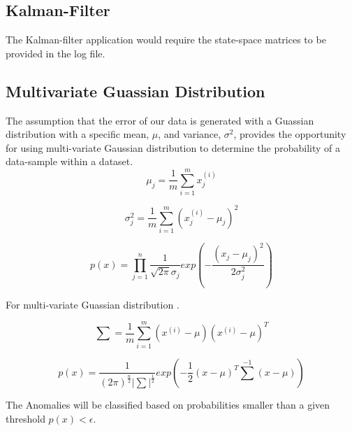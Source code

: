 \subsection{Kalman-Filter}
The Kalman-filter application would require the state-space matrices to be provided in the log file.

\subsection{Multivariate Guassian Distribution}
The assumption that the error of our data is generated with a Guassian distribution with a specific mean, $\mu$, and variance, $\sigma^2$, provides the opportunity for using multi-variate Gaussian distribution to determine the probability of a data-sample within a dataset. 
\begin{equation}
	\label{mean}
	\mu_j = \frac{1}{m} \sum_{i=1}^{m}x_j^{(i)}
\end{equation}

\begin{equation}
	\label{variance}
	\sigma_j^2 = \frac{1}{m} \sum_{i=1}^{m}(x_j^{(i)} - \mu_j)^2
\end{equation}

\begin{equation}
	\label{guassian distribution}
	p(x) = \prod_{j=1}^{n} \frac{1}{\sqrt{2\pi}\sigma_j}exp(-\frac{(x_j-\mu_j)^2}{2\sigma_j^2})
\end{equation}

For multi-variate Guassian distribution \cite{do2008multivariate}.

\begin{equation}
	\label{sum}
	\sum = \frac{1}{m}\sum_{i=1}^{m}(x^{(i)}-\mu)(x^{(i)}-\mu)^T
\end{equation}

\begin{equation}
	\label{multi-variate guassian distribution}
	p(x) = \frac{1}{(2\pi)^{\frac{n}{2}}{\lvert \sum \rvert}^\frac{1}{2}} exp(-\frac{1}{2}(x-\mu)^T{\sum}^{-1}(x-\mu))
\end{equation}

The Anomalies will be classified based on probabilities smaller than a given threshold $p(x) < \epsilon$.

